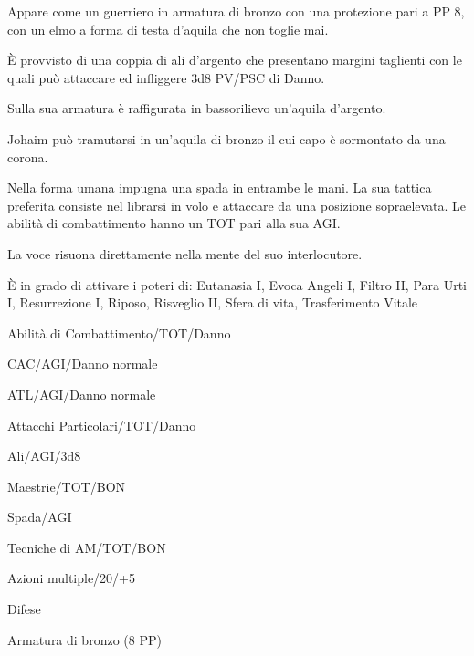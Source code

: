 
Appare come un guerriero in armatura di bronzo con una protezione pari
a PP 8, con un elmo a forma di testa d'aquila che non toglie mai.

\`E provvisto di una coppia di ali d'argento che presentano margini
taglienti con le quali pu\`o attaccare ed infliggere 3d8 PV/PSC di
Danno.

Sulla sua armatura \`e raffigurata in bassorilievo un'aquila
d'argento.

Johaim pu\`o tramutarsi in un'aquila di bronzo il cui capo \`e
sormontato da una corona.

Nella forma umana impugna una spada in entrambe le mani. La sua
tattica preferita consiste nel librarsi in volo e attaccare da una
posizione sopraelevata. Le abilit\`a di combattimento hanno un TOT
pari alla sua AGI.

La voce risuona direttamente nella mente del suo interlocutore.

\`E in grado di attivare i poteri di: Eutanasia I, Evoca Angeli I,
Filtro II, Para Urti I, Resurrezione I, Riposo, Risveglio II, Sfera di
vita, Trasferimento Vitale


\begin{parmostro}{Abilit\`a di Combattimento/TOT/Danno}
\item CAC/AGI/Danno normale
\item ATL/AGI/Danno normale
\end{parmostro}

\begin{parmostro}{Attacchi Particolari/TOT/Danno}
\item Ali/AGI/3d8
\end{parmostro}

\begin{parmostro}{Maestrie/TOT/BON}
\item  Spada/AGI
\end{parmostro}

\begin{parmostro}{Tecniche di AM/TOT/BON}
\item Azioni multiple/20/+5
\end{parmostro}

\begin{parmostro}{Difese}
\item Armatura di bronzo (8 PP)
\end{parmostro}

